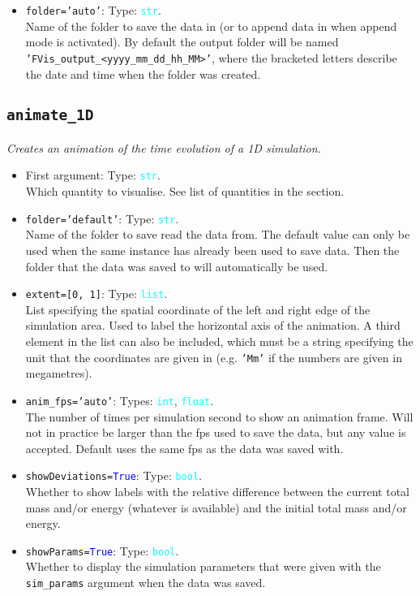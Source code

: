 \documentclass{article}
\newcommand{\ttt}[1]{\texttt{#1}}
\newcommand{\ptype}[1]{\texttt{\textcolor{cyan}{#1}}}
\newcommand{\cbl}[1]{\textcolor{blue}{#1}}
\newcommand{\cro}[1]{\textcolor{RedOrange}{#1}}
\newcommand{\cyo}[1]{\textcolor{YellowOrange}{#1}}
\begin{document}
\begin{itemize}
	\item \ttt{\cro{folder}=\cyo{'auto'}}: Type: \ptype{str}.\\Name of the folder to save the data in (or to append data in when append mode is activated). By default the output folder will be named \ttt{'FVis\_output\_<yyyy\_mm\_dd\_hh\_MM>'}, where the bracketed letters describe the date and time when the folder was created.
\end{itemize}

\subsection{\ttt{animate\_1D}}
\label{sec:anim1}
\textit{Creates an animation of the time evolution of a 1D simulation.}
\begin{itemize}
	\item First argument: Type: \ptype{str}.\\Which quantity to visualise. See list of quantities in the  section.
	\item \ttt{\cro{folder}=\cyo{'default'}}: Type: \ptype{str}.\\Name of the folder to save read the data from. The default value can only be used when the same instance has already been used to save data. Then the folder that the data was saved to will automatically be used.
	\item \ttt{\cro{extent}=[0, 1]}: Type: \ptype{list}.\\List specifying the spatial coordinate of the left and right edge of the simulation area. Used to label the horizontal axis of the animation. A third element in the list can also be included, which must be a string specifying the unit that the coordinates are given in (e.g. \ttt{'Mm'} if the numbers are given in megametres).
	\item \ttt{\cro{anim\_fps}=\cyo{'auto'}}: Types: \ptype{int}, \ptype{float}.\\The number of times per simulation second to show an animation frame. Will not in practice be larger than the fps used to save the data, but any value is accepted. Default uses the same fps as the data was saved with.
	\item \ttt{\cro{showDeviations}=\cbl{True}}: Type: \ptype{bool}.\\Whether to show labels with the relative difference between the current total mass and/or energy (whatever is available) and the initial total mass and/or energy.
	\item \ttt{\cro{showParams}=\cbl{True}}: Type: \ptype{bool}.\\Whether to display the simulation parameters that were given with the \ttt{sim\_params} argument when the data was saved.

\end{itemize}
\end{document}
